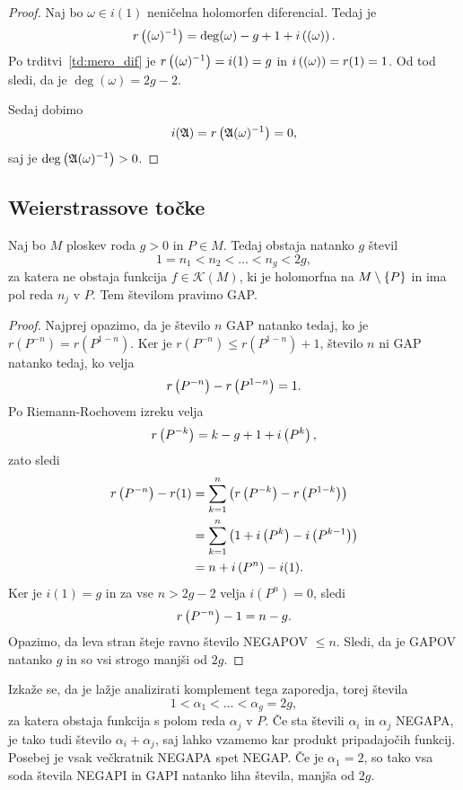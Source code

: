 \begin{proof}
Naj bo $\omega \in i(1)$ neničelna holomorfen diferencial. Tedaj je
\[
r \left((\omega)^{-1}\right) = \deg (\omega) - g + 1 + i \left((\omega)\right).
\]
Po trditvi~\ref{td:mero_dif} je $r \left((\omega)^{-1}\right) = i(1) = g$
in $i \left((\omega)\right) = r(1) = 1$. Od tod sledi, da je
$\deg (\omega) = 2g - 2$.

Sedaj dobimo
\[
i(\mathfrak{A}) = r \left(\mathfrak{A} (\omega)^{-1}\right) = 0,
\]
saj je $\deg \left(\mathfrak{A} (\omega)^{-1}\right) > 0$.
\end{proof}

\subsection{Weierstrassove točke}

\begin{izrek}[Weierstrass]
Naj bo $M$ ploskev roda $g > 0$ in $P \in M$. Tedaj obstaja
natanko $g$ števil
\[
1 = n_1 < n_2 < \dots < n_g < 2g,
\]
za katera ne obstaja funkcija $f \in \mathscr{K}(M)$, ki je
holomorfna na $M \setminus \left\{P\right\}$ in ima pol reda $n_j$ v $P$.
Tem številom pravimo GAP.
\end{izrek}

\begin{proof}
Najprej opazimo, da je število $n$ GAP natanko tedaj, ko je
$r(P^{-n}) = r(P^{1-n})$. Ker je $r(P^{-n}) \leq r(P^{1-n}) + 1$,
število $n$ ni GAP natanko tedaj, ko velja
\[
r \left(P^{-n}\right) - r \left(P^{1-n}\right) = 1.
\]
Po Riemann-Rochovem izreku velja
\[
r \left(P^{-k}\right) = k-g+1 + i \left(P^k\right),
\]
zato sledi
\begin{align*}
r \left(P^{-n}\right) - r(1) &=
\sum_{k=1}^n \left(r \left(P^{-k}\right) - r \left(P^{1-k}\right)\right)
\\
&=
\sum_{k=1}^n \left(1 + i \left(P^k\right) - i \left(P^{k-1}\right)\right)
\\
&=
n + i \left(P^n\right) - i(1).
\end{align*}
Ker je $i(1) = g$ in za vse $n > 2g-2$ velja $i(P^n) = 0$, sledi
\[
r \left(P^{-n}\right) - 1 = n - g.
\]
Opazimo, da leva stran šteje ravno število NEGAPOV $\leq n$.
Sledi, da je GAPOV natanko $g$ in so vsi strogo manjši od $2g$.
\end{proof}

Izkaže se, da je lažje analizirati komplement tega zaporedja, torej
števila
\[
1 < \alpha_1 < \dots < \alpha_g = 2g,
\]
za katera obstaja funkcija s polom reda $\alpha_j$ v $P$. Če sta
števili $\alpha_i$ in $\alpha_j$ NEGAPA, je tako tudi število
$\alpha_i + \alpha_j$, saj lahko vzamemo kar produkt pripadajočih
funkcij. Posebej je vsak večkratnik NEGAPA spet NEGAP. Če je
$\alpha_1 = 2$, so tako vsa soda števila NEGAPI in GAPI natanko
liha števila, manjša od $2g$.

